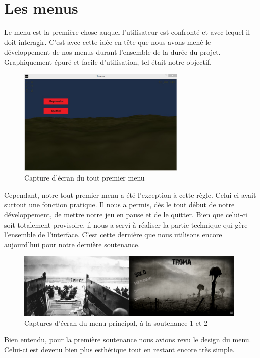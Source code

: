 \documentclass[11pt]{report}
\begin{document}
\section{Les menus}

Le menu est la première chose auquel l'utilisateur est confronté et avec lequel il doit interagir. C'est avec cette idée en tête que nous avons mené le développement de nos menus durant l'ensemble de la durée du projet. Graphiquement épuré et facile d'utilisation, tel était notre objectif.

\begin{figure}[htbp]
\centering
\includegraphics[width=8cm]{menu-pause-0.jpg}
\caption{Capture d'écran du tout premier menu}
\end{figure}

Cependant, notre tout premier menu a été l'exception à cette règle. Celui-ci avait surtout une fonction pratique. Il nous a permis, dès le tout début de notre développement, de mettre notre jeu en pause et de le quitter. Bien que celui-ci soit totalement provisoire, il nous a servi à réaliser la partie technique qui gère l'ensemble de l'interface. C'est cette dernière que nous utilisons encore aujourd'hui pour notre dernière soutenance.

\begin{figure}[htbp]
\centering
\includegraphics[width=11cm]{main-menu-1et2.png}
\caption{Captures d'écran du menu principal, à la soutenance 1 et 2}
\end{figure}

Bien entendu, pour la première soutenance nous avions revu le design du menu. Celui-ci est devenu bien plus esthétique tout en restant encore très simple.
\end{document}

